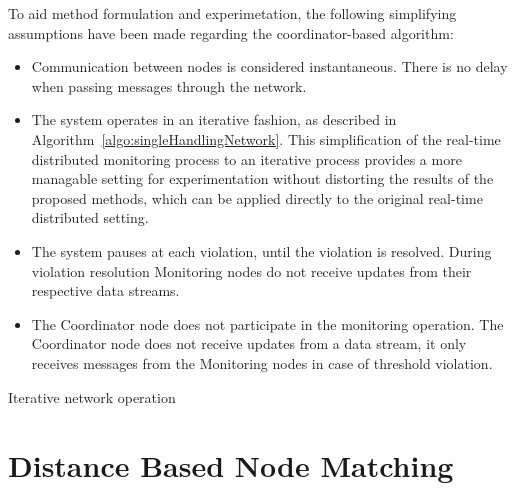 To aid method formulation and experimetation, the following simplifying assumptions have been made regarding the coordinator-based algorithm:
\begin{itemize}
\item Communication between nodes is considered instantaneous. There is no delay when passing messages through the network.

\item The system operates in an iterative fashion, as described in Algorithm~\ref{algo:singleHandlingNetwork}. This simplification of the real-time distributed monitoring process to an iterative process provides a more managable setting for experimentation without distorting the results of the proposed methods, which can be applied directly to the original real-time distributed setting.

\item The system pauses at each violation, until the violation is resolved. During violation resolution Monitoring nodes do not receive updates from their respective data streams.

\item The Coordinator node does not participate in the monitoring operation. The Coordinator node does not receive updates from a data stream, it only receives messages from the Monitoring nodes in case of threshold violation.

\end{itemize}

\begin{algorithm}[H]


\SetAlgoLined
{}
 \caption{Iterative network operation \label{algo:singleHandlingNetwork}} 
\end{algorithm}

\section{Distance Based Node Matching} \label{sec:impl-distNodeMatch}

